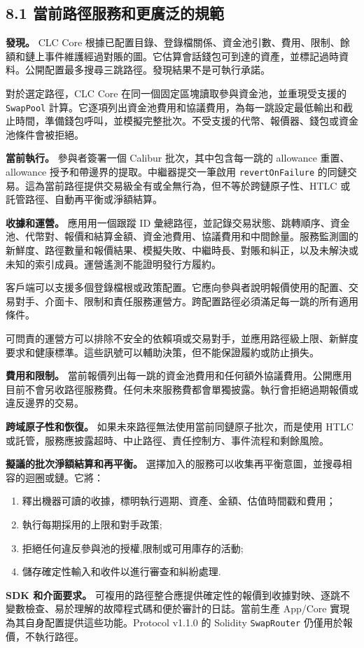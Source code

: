 \documentclass[11pt]{article}
\begin{document}
\subsection*{8.1 當前路徑服務和更廣泛的規範}

\textbf{發現。} CLC Core 根據已配置目錄、登錄檔關係、資金池引數、費用、限制、餘額和鏈上事件維護經過對賬的圖。它估算會話錢包可到達的資產，並標記過時資料。公開配置最多搜尋三跳路徑。發現結果不是可執行承諾。

對於選定路徑，CLC Core 在同一個固定區塊讀取參與資金池，並重現受支援的 \texttt{SwapPool} 計算。它逐項列出資金池費用和協議費用，為每一跳設定最低輸出和截止時間，準備錢包呼叫，並模擬完整批次。不受支援的代幣、報價器、錢包或資金池條件會被拒絕。

\textbf{當前執行。} 參與者簽署一個 Calibur 批次，其中包含每一跳的 allowance 重置、allowance 授予和帶邊界的提取。中繼器提交一筆啟用 \texttt{revertOnFailure} 的同鏈交易。這為當前路徑提供交易級全有或全無行為，但不等於跨鏈原子性、HTLC 或託管路徑、自動再平衡或淨額結算。

\textbf{收據和運營。} 應用用一個跟蹤 ID 彙總路徑，並記錄交易狀態、跳轉順序、資金池、代幣對、報價和結算金額、資金池費用、協議費用和中間餘量。服務監測圖的新鮮度、路徑數量和報價結果、模擬失敗、中繼時長、對賬和糾正，以及未解決或未知的索引成員。運營遙測不能證明發行方履約。

客戶端可以支援多個登錄檔根或政策配置。它應向參與者說明報價使用的配置、交易對手、介面卡、限制和責任服務運營方。跨配置路徑必須滿足每一跳的所有適用條件。

可問責的運營方可以排除不安全的依賴項或交易對手，並應用路徑級上限、新鮮度要求和健康標準。這些訊號可以輔助決策，但不能保證履約或防止損失。

\textbf{費用和限制。} 當前報價列出每一跳的資金池費用和任何額外協議費用。公開應用目前不會另收路徑服務費。任何未來服務費都會單獨披露。執行會拒絕過期報價或違反邊界的交易。

\textbf{跨域原子性和恢復。} 如果未來路徑無法使用當前同鏈原子批次，而是使用 HTLC 或託管，服務應披露超時、中止路徑、責任控制方、事件流程和剩餘風險。

\textbf{擬議的批次淨額結算和再平衡。} 選擇加入的服務可以收集再平衡意圖，並搜尋相容的迴圈或鏈。它將：

\begin{enumerate}[leftmargin=*]
\item 釋出機器可讀的收據，標明執行週期、資產、金額、估值時間戳和費用；
\item 執行每期採用的上限和對手政策;
\item 拒絕任何違反參與池的授權,限制或可用庫存的活動;
\item 儲存確定性輸入和收件以進行審查和糾紛處理.
\end{enumerate}
\textbf{SDK 和介面要求。} 可複用的路徑整合應提供確定性的報價到收據對映、逐跳不變數檢查、易於理解的故障程式碼和便於審計的日誌。當前生產 App/Core 實現為其自身配置提供這些功能。Protocol v1.1.0 的 Solidity \texttt{SwapRouter} 仍僅用於報價，不執行路徑。
\end{document}
